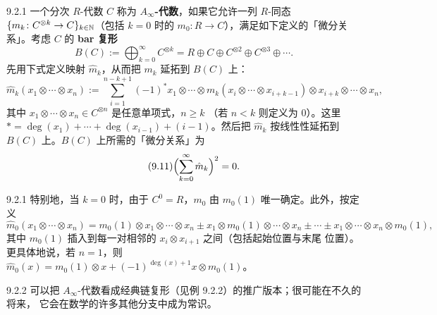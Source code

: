\begin{wdefn}{9.2.1}
  一个分次 $R$-代数 $C$ 称为 \textbf{$A_\infty$-代数}，如果它允许一列
  $R$-同态 $\{m_k\colon C^{\otimes k}\to C\}_{k\in\mathbb{N}}$（包括 $k=0$ 时的
  $m_0\colon R\to C$），满足如下定义的「微分关系」。考虑 $C$ 的 \textbf{bar 复形}
  \begin{equation*}
    B(C):=\bigoplus_{k=0}^\infty C^{\otimes k}
    =R\oplus C\oplus C^{\otimes2}\oplus C^{\otimes3}\oplus\cdots.
  \end{equation*}
  先用下式定义映射 $\hat m_k$，从而把 $m_k$ 延拓到 $B(C)$ 上：
  \begin{equation*}
    \hat m_k(x_1\otimes\cdots\otimes x_n)
    :=\sum_{i=1}^{n-k+1}(-1)^*x_1\otimes\cdots\otimes
    m_k(x_i\otimes\cdots\otimes x_{i+k-1})\otimes x_{i+k}\otimes\cdots\otimes x_n,
  \end{equation*}
  其中 $x_1\otimes\cdots\otimes x_n\in C^{\otimes n}$ 是任意单项式，$n\geqslant k$
  （若 $n<k$ 则定义为 $0$）。这里
  $*=\deg(x_1)+\cdots+\deg(x_{i-1})+(i-1)$。然后把 $\hat m_k$ 按线性性延拓到
  $B(C)$ 上。$B(C)$ 上所需的「微分关系」为
  \begin{equation}\tag{9.11}
    \Bigl(\sum_{k=0}^\infty\hat m_k\Bigr)^2=0.
  \end{equation}
\end{wdefn}

\begin{wrem}{9.2.1}
  特别地，当 $k=0$ 时，由于 $C^0=R$，$m_0$ 由 $m_0(1)$ 唯一确定。此外，按定义
  \begin{equation*}
    \hat m_0(x_1\otimes\cdots\otimes x_n)
    =m_0(1)\otimes x_1\otimes\cdots\otimes x_n
    \pm x_1\otimes m_0(1)\otimes\cdots\otimes x_n\pm\cdots
    \pm x_1\otimes\cdots\otimes x_n\otimes m_0(1),
  \end{equation*}
  其中 $m_0(1)$ 插入到每一对相邻的 $x_i\otimes x_{i+1}$ 之间（包括起始位置与末尾
  位置）。更具体地说，若 $n=1$，则
  $\hat m_0(x)=m_0(1)\otimes x+(-1)^{\deg(x)+1}x\otimes m_0(1)$。
\end{wrem}

\begin{wrem}{9.2.2}
  可以把 $A_\infty$-代数看成经典链复形（见例 9.2.2）的推广版本；很可能在不久的将来，
  它会在数学的许多其他分支中成为常识。
\end{wrem}

